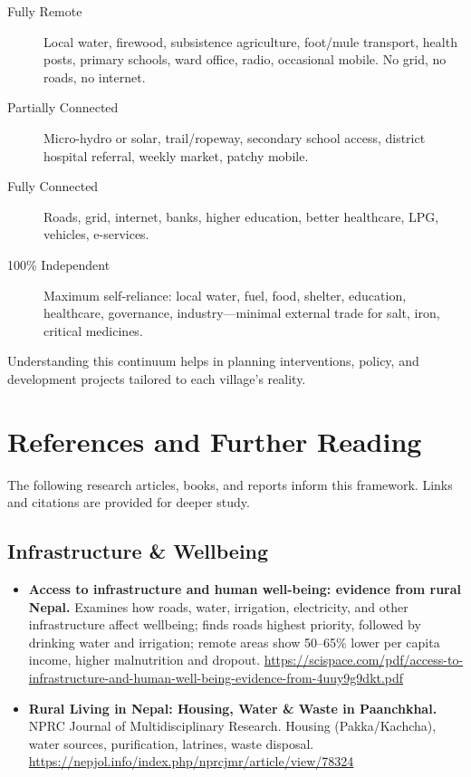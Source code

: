 \documentclass[11pt,a4paper]{article}
\begin{document}
\begin{description}
    \item[Fully Remote] Local water, firewood, subsistence agriculture, foot/mule transport, health posts, primary schools, ward office, radio, occasional mobile. No grid, no roads, no internet.
    \item[Partially Connected] Micro-hydro or solar, trail/ropeway, secondary school access, district hospital referral, weekly market, patchy mobile.
    \item[Fully Connected] Roads, grid, internet, banks, higher education, better healthcare, LPG, vehicles, e-services.
    \item[100\% Independent] Maximum self-reliance: local water, fuel, food, shelter, education, healthcare, governance, industry---minimal external trade for salt, iron, critical medicines.
\end{description}

Understanding this continuum helps in planning interventions, policy, and development projects tailored to each village's reality.

\section{References and Further Reading}

The following research articles, books, and reports inform this framework. Links and citations are provided for deeper study.

\subsection{Infrastructure \& Wellbeing}
\begin{itemize}
    \item \textbf{Access to infrastructure and human well-being: evidence from rural Nepal.} Examines how roads, water, irrigation, electricity, and other infrastructure affect wellbeing; finds roads highest priority, followed by drinking water and irrigation; remote areas show 50--65\% lower per capita income, higher malnutrition and dropout. \url{https://scispace.com/pdf/access-to-infrastructure-and-human-well-being-evidence-from-4uuy9g9dkt.pdf}
    \item \textbf{Rural Living in Nepal: Housing, Water \& Waste in Paanchkhal.} NPRC Journal of Multidisciplinary Research. Housing (Pakka/Kachcha), water sources, purification, latrines, waste disposal. \url{https://nepjol.info/index.php/nprcjmr/article/view/78324}
\end{itemize}
\end{document}
